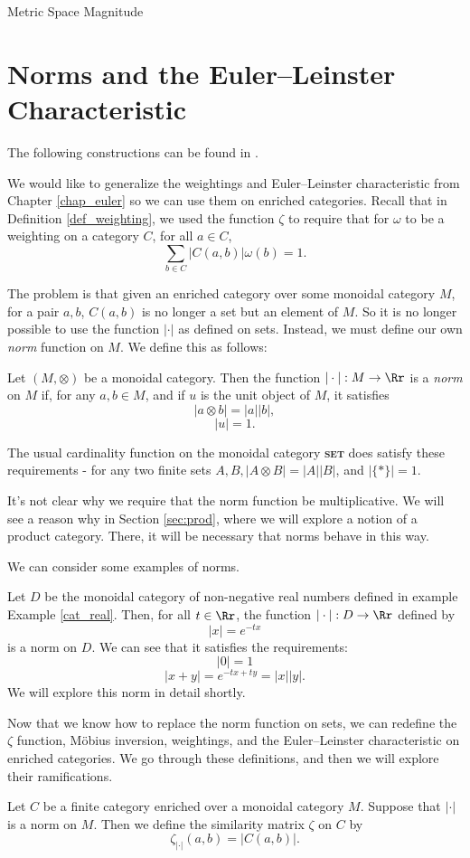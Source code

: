 \documentclass[12pt]{pom_thesis}
\newcommand{\catname}[1]{\textbf{\textsc{#1}}}
\begin{document}
\begin{chapter}{Metric Space Magnitude}
\section{Norms and the Euler--Leinster Characteristic}
The following constructions can be found in \cite{Nog1, Lein4}.

We would like to generalize the weightings and Euler--Leinster characteristic from Chapter \ref{chap_euler} so we can use them on enriched categories. Recall that in Definition \ref{def_weighting}, we used the function $\zeta$ to require that for $\omega$ to be a weighting on a category $C$, for all $a \in C$,
\[
\sum_{b \in C}|C(a,b)|\omega(b) = 1.
\]

The problem is that given an enriched category over some monoidal category $M$, for a pair $a,b$, $C(a,b)$ is no longer a set but an element of $M$. So it is no longer possible to use the function $|\cdot|$ as defined on sets. Instead, we must define our own \emph{norm} function on $M$. We define this as follows:
\begin{defn}\label{def:norm}
Let $(M,\otimes)$ be a monoidal category. Then the function $| \cdot |: M \rightarrow \Rr$ is a \emph{norm} on $M$ if, for any $a,b\in M$, and if $u$ is the unit object of $M$, it satisfies
\[
|a \otimes b| = |a||b|,
\]
\[
|u| = 1.
\]
\end{defn}

The usual cardinality function on the monoidal category \catname{set} does satisfy these requirements - for any two finite sets $A,B, |A \otimes B| = |A||B|$, and $|\{*\}|=1$.

It's not clear why we require that the norm function be multiplicative. We will see a reason why in Section \ref{sec:prod}, where we will explore a notion of a product category. There, it will be necessary that norms behave in this way.

We can consider some examples of norms.
\begin{examp}\label{exp_norm}
Let $D$ be the monoidal category of non-negative real numbers defined in example Example \ref{cat_real}. Then, for all $t \in \Rr$, the function $|\cdot|:D \rightarrow \Rr$ defined by 
\[
|x| = e^{-tx}
\]
is a norm on $D$. We can see that it satisfies the requirements:
\[|0| = 1
\]
\[|x + y| = e^{-tx + ty} = |x||y|.
\]
We will explore this norm in detail shortly.
\end{examp}

Now that we know how to replace the norm function on sets, we can redefine the $\zeta$ function, M\"obius inversion, weightings, and the Euler--Leinster characteristic on enriched categories. We go through these definitions, and then we will explore their ramifications.
\begin{defn}
Let $C$ be a finite category enriched over a monoidal category $M$. Suppose that $|\cdot|$ is a norm on $M$. Then we define the similarity matrix $\zeta$ on $C$ by
\[
\zeta_{|\cdot|}(a,b) = |C(a,b)|.
\]
\end{defn}


\end{chapter}
\end{document}
